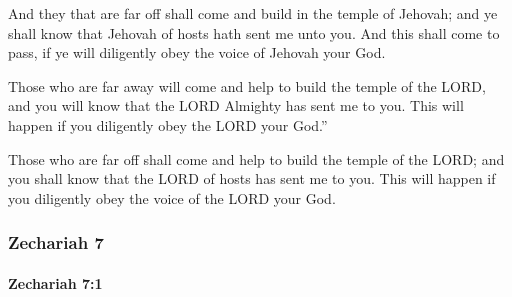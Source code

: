 			\begin{versebox}
					\item[BHS] 
					\item[LXX] 
					\item[ASV] And they that are far off shall come and build in the temple of Jehovah; and ye shall know that Jehovah of hosts hath sent me unto you. And this shall come to pass, if ye will diligently obey the voice of Jehovah your God.
					\item[NIV] Those who are far away will come and help to build the temple of the LORD, and you will know that the LORD Almighty has sent me to you. This will happen if you diligently obey the LORD your God.”
					\item[NRSV] Those who are far off shall come and help to build the temple of the LORD; and you shall know that the LORD of hosts has sent me to you. This will happen if you diligently obey the voice of the LORD your God.
			\end{versebox}
	\subsubsection{Zechariah 7} %
		\label{ZECHARIAH-7}

		\paragraph{Zechariah 7:1} %
			\label{ZECHARIAH-7-1}

